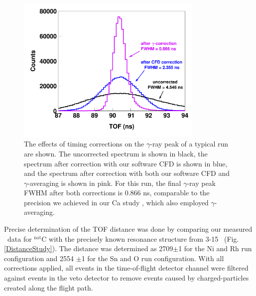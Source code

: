 \begin{figure}[tb]
    \centering
    \includegraphics[width=0.8\textwidth]{figures/TimeCorrections.png}
    \caption[Improving timing precision with a software CFD and $\gamma$-ray averaging]
    {The effects of timing corrections on the $\gamma$-ray
        peak of a typical run are shown. The uncorrected spectrum is shown in black,
        the spectrum after correction with our software CFD is shown in blue,
        and the spectrum after correction with both our software CFD and
        $\gamma$-averaging is 
        shown in pink. For this run, the final $\gamma$-ray peak 
        FWHM after both corrections is 0.866 ns, comparable to the precision we
        achieved in our Ca study \cite{Shane2010}, which also employed $\gamma$-
        averaging.}
    \label{TimingCorrectionStudy}
\end{figure}

Precise determination of the TOF distance was done by comparing our measured \tot\ data
for $^{\text{nat}}$C with the precisely known resonance structure from
3-15 \mega\electronvolt\ (Fig. \ref{DistanceStudy}).
The distance was determined as 2709$\pm$1 \centi\meter for the
Ni and Rh run configuration and 2554 $\pm$1 \centi\meter 
for the Sn and O run configuration. With all corrections applied, all events in the 
time-of-flight detector channel were filtered against events in the veto detector to remove
events caused by charged-particles created along the flight path.

